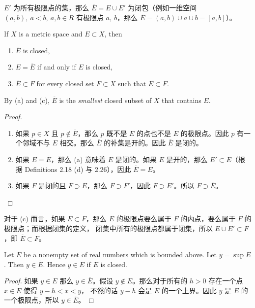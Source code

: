\documentclass[../poma-notes.tex]{subfiles}
\begin{document}
\anote $E'$ 为所有极限点的集，那么 $\overline{E} = E \cup E'$ 为闭包（例如一维空间 $(a, b), \ a<b, \ a,b \in R$ 有极限点
$a, \ b$，那么 $\overline{E} = (a,b) \cup {a} \cup {b} = [a,b]$）。

\begin{theorem}
  If $X$ is a metric space and $E \subset X$, then
  \begin{enumerate}[label=(\alph*)]
    \item $\overline{E}$ is closed,
    \item $E = \overline{E}$ if and only if $E$ is closed,
    \item $\overline{E} \subset F$ for every closed set $F \subset X$ such that $E \subset F$.
  \end{enumerate}
  By (a) and (c), $\overline{E}$ is the \textit{smallest} closed subset of $X$ that contains $E$.
\end{theorem}

\begin{proof}
  \begin{enumerate}[label=(\alph*)]
    \item 如果 $p \in X$ 且 $p \notin \overline{E}$，那么 $p$ 既不是 $E$ 的点也不是 $E$ 的极限点。因此 $p$ 有一个邻域不与
          $E$ 相交。那么 $\overline{E}$ 的补集是开的。因此 $\overline{E}$ 是闭的。
    \item 如果 $E = \overline{E}$，那么 (a) 意味着 $E$ 是闭的。如果 $E$ 是开的，那么 $E' \subset E$（根据 Definitions 2.18 (d)
          与 2.26），因此 $\overline{E} = E$。
    \item 如果 $F$ 是闭的且 $F \supset E$，那么 $F \supset F'$，因此 $F \supset E'$。所以 $F \supset \overline{E}$。
  \end{enumerate}
\end{proof}

\anote
对于 (c) 而言，如果 $E \subset F$，那么 $E$ 的极限点要么属于 $F$ 的内点，要么属于 $F$ 的极限点；而根据闭集的定义，
闭集中所有的极限点都属于闭集，所以 $E \cup E' \subset F$，即 $\overline{E} \subset F$。

\begin{theorem}
  Let $E$ be a nonempty set of real numbers which is bounded above. Let $y = \sup E$. Then $y \in \overline{E}$.
  Hence $y \in E$ if $E$ is closed.
\end{theorem}

\begin{proof}
  如果 $y \in E$ 那么 $y \in \overline{E}$。假设 $y \notin E$。那么对于所有的 $h>0$ 存在一个点 $x \in E$ 使得 $y-h<x<y$，
  不然的话 $y-h$ 会是 $E$ 的一个上界。因此 $y$ 是 $E$ 的一个极限点，所以 $y \in \overline{E}$。
\end{proof}
\end{document}
